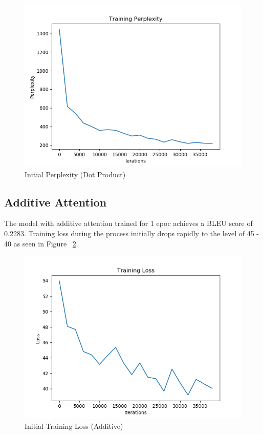 \documentclass[11pt,a4paper]{article}
\begin{document}
\begin{figure}[!htbp]
\includegraphics[width=\linewidth]{de_dot_ppl_1.png}
\caption{Initial Perplexity (Dot Product)}
\label{fig23}
\end{figure}


\pagebreak

\subsection{Additive Attention}

The model with additive attention trained for 1 epoc achieves a BLEU score of 0.2283.
Training loss during the process initially drops rapidly to the level of 45 - 40 as seen in Figure ~\ref{fig25}. 

\begin{figure}[!htbp]
\includegraphics[width=\linewidth]{de_add_loss_1.png}
\caption{Initial Training Loss (Additive)}
\label{fig25}
\end{figure}
\end{document}

